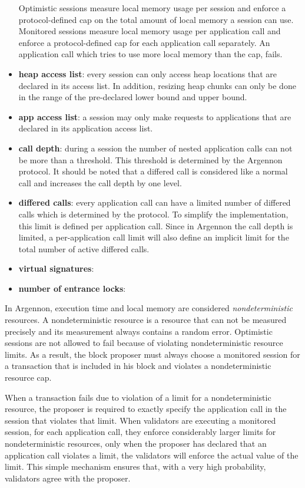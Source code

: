 \begin{itemize}
    Optimistic sessions measure local memory usage per session and enforce a protocol-defined cap on the total amount
    of local memory a session can use. Monitored sessions measure local memory usage per
    application call and enforce a protocol-defined cap for each application call separately. An application call
    which tries to use more local memory than the cap, fails.
    \item \textbf{heap access list}:
    every session can only access heap locations that are declared in its access list. In addition,
    resizing heap chunks can only be done in the range of the pre-declared lower bound and upper bound.
    \item \textbf{app access list}:
    a session may only make requests to applications that are declared in its application access list.
    \item \textbf{call depth}:
    during a session the number of nested application calls can not be more than a threshold. This threshold is
    determined by the Argennon protocol. It should be noted that a differed call is considered like a normal call and
    increases the call depth by one level.
    \item \textbf{differed calls}:
    every application call can have a limited number of differed calls which is determined by the protocol.
    To simplify the implementation, this limit is defined per application call. Since in Argennon the call depth is
    limited, a per-application call limit will also define an implicit limit for the total number of active differed
    calls.
    \item \textbf{virtual signatures}:
    \item \textbf{number of entrance locks}:
\end{itemize}

In Argennon, execution time and local memory are considered \emph{nondeterministic} resources. A nondeterministic
resource is a resource that can not be measured precisely and its measurement always contains a random error.
Optimistic sessions are not allowed to fail because of violating nondeterministic resource limits. As a result, the
block proposer must always choose a monitored session for a transaction that is included in his block and violates a
nondeterministic resource cap.

When a transaction fails due to violation of a limit for a nondeterministic resource, the proposer is
required to exactly specify the application call in the session that violates that limit. When validators are
executing a monitored session, for each application call, they enforce considerably larger limits for
nondeterministic resources, only when the proposer has declared that an application call violates a limit, the
validators will enforce the actual value of the limit. This simple mechanism ensures that, with a very high
probability, validators agree with the proposer.


